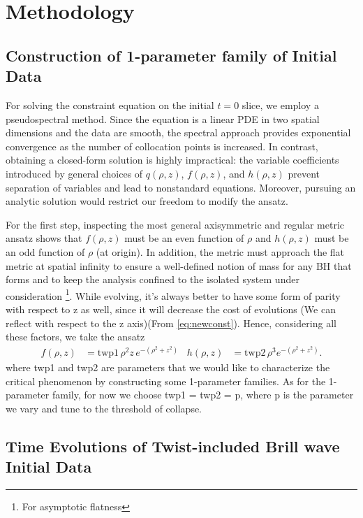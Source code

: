 \chapter{Methodology}

\section{Construction of 1-parameter family of Initial Data}
\label{Construction}
For solving the constraint equation on the initial $t=0$ slice, we employ a pseudospectral method. Since the equation is a linear PDE in two spatial dimensions and the data are smooth, the spectral approach provides exponential convergence as the number of collocation points is increased. In contrast, obtaining a closed-form solution is highly impractical: the variable coefficients introduced by general choices of $q(\rho,z)$, $f(\rho,z)$, and $h(\rho,z)$ prevent separation of variables and lead to nonstandard equations. Moreover, pursuing an analytic solution would restrict our freedom to modify the ansatz.

For the first step, inspecting the most general axisymmetric and regular metric ansatz \cite{rinne_2025} shows that \(f(\rho,z)\) must be an even function of \(\rho\) and \(h(\rho,z)\) must be an odd function of \(\rho\) (at origin). In addition, the metric must approach the flat metric at spatial infinity to ensure a well-defined notion of mass for any BH that forms and to keep the analysis confined to the isolated system under consideration \footnote{For asymptotic flatness}. While evolving, it's always better to have some form of parity with respect to z as well, since it will decrease the cost of evolutions (We can reflect with respect to the z axis)(From \ref{eq:newconst}). Hence, considering all these factors, we take the ansatz
\begin{equation}
\begin{aligned}
f(\rho,z) &= \text{twp1}\,\rho^{2} z\, e^{-(\rho^{2} + z^{2})} \; \; \;
h(\rho,z) &= \text{twp2}\,\rho^{3} e^{-(\rho^{2} + z^{2})}.
\end{aligned}
\label{eq:ansatz}
\end{equation}
where twp1 and twp2 are parameters that we would like to characterize the critical phenomenon by constructing some 1-parameter families. As for the 1-parameter family, for now we choose twp1 = twp2 = p, where p is the parameter we vary and tune to the threshold of collapse.


\section{Time Evolutions of Twist-included Brill wave Initial Data}

